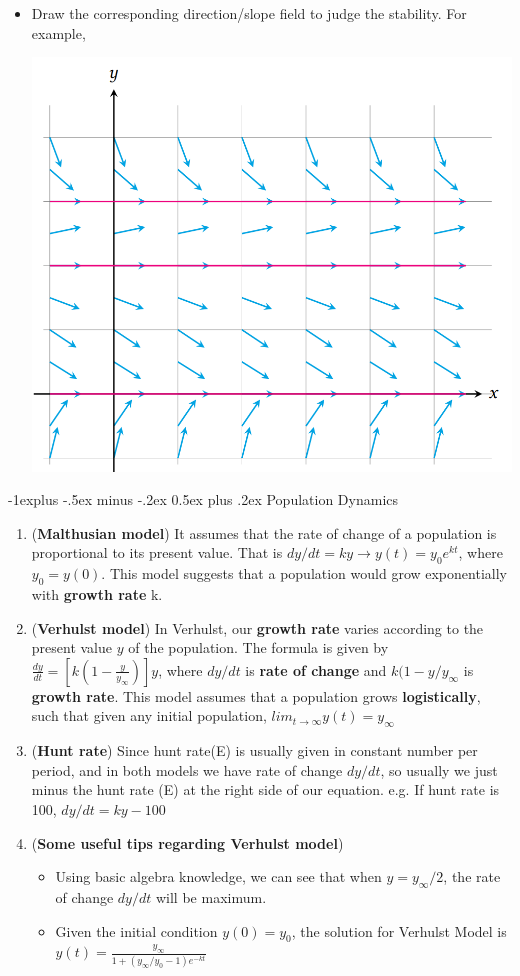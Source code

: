 \documentclass[10pt, landscape]{article}
\makeatletter
\renewcommand{\subsection}{\@startsection{subsection}{2}{0mm}%
                                {-1explus -.5ex minus -.2ex}%
                                {0.5ex plus .2ex}%
                                {\normalfont\normalsize\bfseries}}
\makeatother
\begin{document}
\begin{multicols}{4}
\begin{enumerate}
\begin{itemize}
        \item Draw the corresponding direction/slope field to judge the stability. For example,\\
        \centerline{\includegraphics[width=0.5\linewidth]{image/direction-field.png}}
    \end{itemize}
\end{enumerate}
\subsection{Population Dynamics}
\begin{enumerate}
    \item (\textbf{Malthusian model}) It assumes that the rate of change of a population is proportional to its present value. That is $dy/dt=ky\rightarrow y(t)=y_0e^{kt}$, where $y_0=y(0)$. This model suggests that a population would grow exponentially with \textbf{growth rate} k.
    \item (\textbf{Verhulst model}) In Verhulst, our \textbf{growth rate} varies according to the present value $y$ of the population. The formula is given by $\frac{dy}{dt}=[k(1-\frac{y}{y_\infty})]y$, where $dy/dt$ is \textbf{rate of change} and $k(1-y/y_\infty$ is \textbf{growth rate}. This model assumes that a population grows \textbf{logistically}, such that given any initial population, $lim_{t\to \infty}y(t)=y_\infty$
    \item (\textbf{Hunt rate}) Since hunt rate(E) is usually given in constant number per period, and in both models we have rate of change $dy/dt$, so usually we just minus the hunt rate (E) at the right side of our equation. e.g. If hunt rate is 100, $dy/dt=ky-100$
    \item (\textbf{Some useful tips regarding Verhulst model})
    \begin{itemize}
        \item Using basic algebra knowledge, we can see that when $y=y_\infty/2$, the rate of change $dy/dt$ will be maximum.
        \item Given the initial condition $y(0)=y_0$, the solution for Verhulst Model is $y(t)=\frac{y_\infty}{1+(y_\infty/y_0-1)e^{-kt}}$
    \end{itemize}
\end{enumerate}


\end{multicols}
\end{document}
